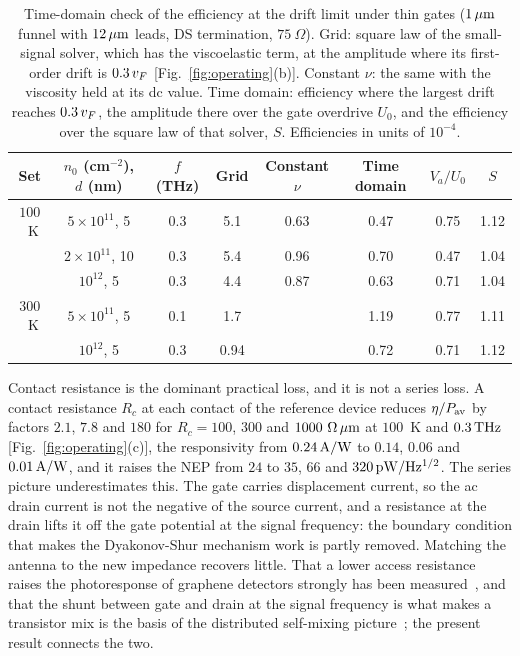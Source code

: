 \begin{table}
\caption{Time-domain check of the efficiency at the drift limit under
thin gates ($1\,\mu\mathrm{m}$ funnel with $12\,\mu\mathrm{m}$ leads, DS termination,
$75\ \Omega$). Grid: square law of the small-signal solver, which has
the viscoelastic term, at the amplitude where its first-order drift is
$0.3\,v_{F}$ [Fig.~\ref{fig:operating}(b)]. Constant $\nu$: the same with
the viscosity held at its dc value. Time domain: efficiency where the
largest drift reaches $0.3\,v_{F}$, the amplitude there over the gate
overdrive $U_{0}$, and the efficiency over the square law of that
solver, $S$. Efficiencies in units of $10^{-4}$.}
\label{tab:ladders}
\begin{ruledtabular}
\begin{tabular}{cccccccc}
Set & $n_{0}$ (cm$^{-2}$), $d$ (nm) & $f$ (THz) & Grid & Constant $\nu$ & Time domain & $V_{a}/U_{0}$ & $S$ \\
\hline
$100$~K & $5\times10^{11}$, 5 & 0.3 & 5.1 & 0.63 & 0.47 & 0.75 & 1.12 \\
 & $2\times10^{11}$, 10 & 0.3 & 5.4 & 0.96 & 0.70 & 0.47 & 1.04 \\
 & $10^{12}$, 5 & 0.3 & 4.4 & 0.87 & 0.63 & 0.71 & 1.04 \\
$300$~K & $5\times10^{11}$, 5 & 0.1 & 1.7 & & 1.19 & 0.77 & 1.11 \\
 & $10^{12}$, 5 & 0.3 & 0.94 & & 0.72 & 0.71 & 1.12 \\
\end{tabular}
\end{ruledtabular}
\end{table}

Contact resistance is the dominant practical loss, and it is not a series
loss. A contact resistance $R_{c}$ at each contact of the reference device
reduces $\eta/P_{\mathrm{av}}$ by factors $2.1$, $7.8$ and $180$ for $R_{c}=100$, $300$
and $1000\ \Omega\,\mu\mathrm{m}$ at $100$~K and $0.3\,\mathrm{THz}$
[Fig.~\ref{fig:operating}(c)], the responsivity from $0.24\,\mathrm{A/W}$ to $0.14$,
$0.06$ and $0.01\,\mathrm{A/W}$, and it raises the NEP from $24$ to $35$, $66$ and
$320\,\mathrm{pW/Hz^{1/2}}$. The series picture underestimates this. The gate carries
displacement current, so the ac drain current is not the negative of the
source current, and a resistance at the drain lifts it off the gate
potential at the signal frequency: the boundary condition that makes the
Dyakonov-Shur mechanism work is partly removed. Matching the antenna to the
new impedance recovers little. That a lower access resistance raises the
photoresponse of graphene detectors strongly has been
measured~\cite{castello2024impact}, and that the shunt
between gate and drain at the signal frequency is what makes a transistor
mix is the basis of the distributed self-mixing
picture~\cite{lisauskas2009rational}; the present result connects the two.

